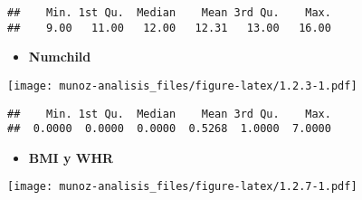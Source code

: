 \documentclass[
]{article}
\newenvironment{Shaded}{\begin{snugshade}}{\end{snugshade}}
\newcommand{\DataTypeTok}[1]{\textcolor[rgb]{0.13,0.29,0.53}{#1}}
\newcommand{\DecValTok}[1]{\textcolor[rgb]{0.00,0.00,0.81}{#1}}
\newcommand{\KeywordTok}[1]{\textcolor[rgb]{0.13,0.29,0.53}{\textbf{#1}}}
\newcommand{\NormalTok}[1]{#1}
\newcommand{\OperatorTok}[1]{\textcolor[rgb]{0.81,0.36,0.00}{\textbf{#1}}}
\newcommand{\StringTok}[1]{\textcolor[rgb]{0.31,0.60,0.02}{#1}}
\providecommand{\tightlist}{%
  \setlength{\itemsep}{0pt}\setlength{\parskip}{0pt}}
\begin{document}
\begin{verbatim}
##    Min. 1st Qu.  Median    Mean 3rd Qu.    Max. 
##    9.00   11.00   12.00   12.31   13.00   16.00
\end{verbatim}

\begin{itemize}
\tightlist
\item
  \textbf{Numchild}
\end{itemize}

\begin{Shaded}
\end{Shaded}

\texttt{[image: munoz-analisis\_files/figure-latex/1.2.3-1.pdf]}

\begin{Shaded}
\end{Shaded}

\begin{verbatim}
##    Min. 1st Qu.  Median    Mean 3rd Qu.    Max. 
##  0.0000  0.0000  0.0000  0.5268  1.0000  7.0000
\end{verbatim}

\begin{itemize}
\tightlist
\item
  \textbf{BMI y WHR}
\end{itemize}

\begin{Shaded}
\end{Shaded}

\texttt{[image: munoz-analisis\_files/figure-latex/1.2.7-1.pdf]}
\end{document}
